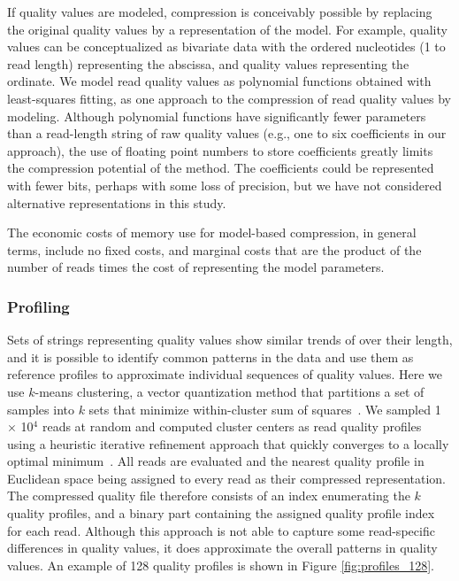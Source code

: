 \documentclass{bioinfo}
\begin{document}
\begin{methods}
If quality values are modeled, compression is conceivably possible by
replacing the original quality values by a representation of the
model. For example, quality values can be conceptualized as bivariate
data with the ordered nucleotides (1 to read length) representing the
abscissa, and quality values representing the ordinate. We model read
quality values as polynomial functions obtained with least-squares
fitting, as one approach to the compression of read quality values by
modeling. Although polynomial functions have significantly fewer
parameters than a read-length string of raw quality values (e.g., one
to six coefficients in our approach), the use of floating point
numbers to store coefficients greatly limits the compression potential
of the method. The coefficients could be represented with fewer bits,
perhaps with some loss of precision, but we have not considered
alternative representations in this study.

The economic costs of memory use for model-based compression, in
general terms, include no fixed costs, and marginal costs that are the
product of the number of reads times the cost of representing the
model parameters.

\subsubsection{Profiling}

Sets of strings representing quality values show similar trends of
over their length, and it is possible to identify common patterns in
the data and use them as reference profiles to approximate individual
sequences of quality values. Here we use $k$-means clustering, a
vector quantization method that partitions a set of samples into $k$
sets that minimize within-cluster sum of
squares~\citep{macqueen1967some}. We sampled 1 $\times$ 10$^{4}$ reads
at random and computed cluster centers as read quality profiles using
a heuristic iterative refinement approach that quickly converges to a
locally optimal minimum~\citep{hartigan1979algorithm}. All reads are
evaluated and the nearest quality profile in Euclidean space being
assigned to every read as their compressed representation.  The
compressed quality file therefore consists of an index enumerating the
$k$ quality profiles, and a binary part containing the assigned
quality profile index for each read.  Although this approach is not
able to capture some read-specific differences in quality values, it
does approximate the overall patterns in quality values. An example of
128 quality profiles is shown in Figure \ref{fig:profiles_128}.


\end{methods}
\end{document}
